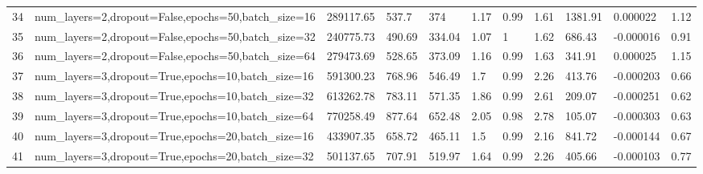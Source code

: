 \begin{longtable}{C{0.8cm} L{2cm} C{1.15cm} C{1.15cm} C{1.15cm} C{1.15cm} C{0.85cm} C{1.25cm} C{1.2cm} C{1.5cm} C{1.0cm}}
34 & num\_layers=2,\newline dropout=False,\newline epochs=50,\newline batch\_size=16 & 289117.65 & 537.7 & 374 & 1.17 & 0.99 & 1.61 & 1381.91 & 0.000022 & 1.12 \\
35 & num\_layers=2,\newline dropout=False,\newline epochs=50,\newline batch\_size=32 & 240775.73 & 490.69 & 334.04 & 1.07 & 1 & 1.62 & 686.43 & -0.000016 & 0.91 \\
36 & num\_layers=2,\newline dropout=False,\newline epochs=50,\newline batch\_size=64 & 279473.69 & 528.65 & 373.09 & 1.16 & 0.99 & 1.63 & 341.91 & 0.000025 & 1.15 \\
37 & num\_layers=3,\newline dropout=True,\newline epochs=10,\newline batch\_size=16 & 591300.23 & 768.96 & 546.49 & 1.7 & 0.99 & 2.26 & 413.76 & -0.000203 & 0.66 \\
38 & num\_layers=3,\newline dropout=True,\newline epochs=10,\newline batch\_size=32 & 613262.78 & 783.11 & 571.35 & 1.86 & 0.99 & 2.61 & 209.07 & -0.000251 & 0.62 \\
39 & num\_layers=3,\newline dropout=True,\newline epochs=10,\newline batch\_size=64 & 770258.49 & 877.64 & 652.48 & 2.05 & 0.98 & 2.78 & 105.07 & -0.000303 & 0.63 \\
40 & num\_layers=3,\newline dropout=True,\newline epochs=20,\newline batch\_size=16 & 433907.35 & 658.72 & 465.11 & 1.5 & 0.99 & 2.16 & 841.72 & -0.000144 & 0.67 \\
41 & num\_layers=3,\newline dropout=True,\newline epochs=20,\newline batch\_size=32 & 501137.65 & 707.91 & 519.97 & 1.64 & 0.99 & 2.26 & 405.66 & -0.000103 & 0.77 \\

\end{longtable}

